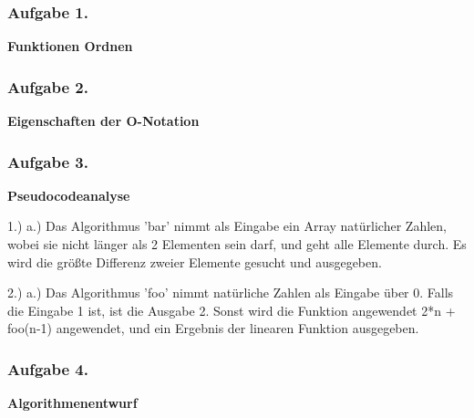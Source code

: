 \documentclass[a4paper,12pt]{article}
\newcommand{\ex}[1]{\newpage\subsubsection*{Aufgabe #1.}}
\begin{document}
	\ex{1}

	\textbf{Funktionen Ordnen}
	\begin{center}
		
	\end{center}

	\ex{2}

	\textbf{Eigenschaften der O-Notation}
	\begin{center}
		
	\end{center}

	\ex{3}

	\textbf{Pseudocodeanalyse}
	\begin{center}
		1.)
		a.)
		Das Algorithmus 'bar' nimmt als Eingabe ein Array natürlicher Zahlen, wobei sie nicht länger als 2 Elementen sein darf, und geht alle Elemente durch.
		Es wird die größte Differenz zweier Elemente gesucht und ausgegeben.
		
		2.)
		a.)
		Das Algorithmus 'foo' nimmt natürliche Zahlen als Eingabe über 0.
		Falls die Eingabe 1 ist, ist die Ausgabe 2.
		Sonst wird die Funktion angewendet 2*n + foo(n-1) angewendet, und ein Ergebnis der linearen Funktion ausgegeben.
	\end{center}

	\ex{4}

	\textbf{Algorithmenentwurf}
	\begin{center}
		
	\end{center}
\end{document}
